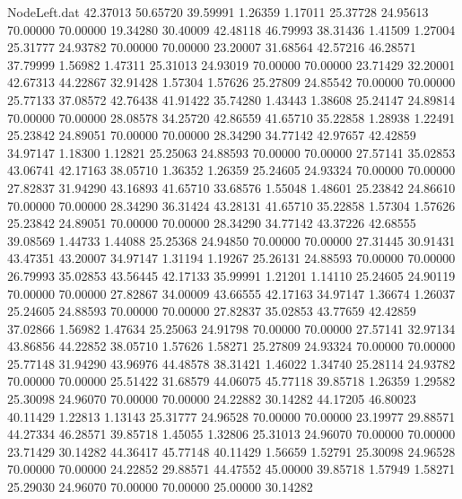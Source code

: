 \begin{filecontents}{NodeLeft.dat}
  42.37013   50.65720   39.59991     1.26359    1.17011   25.37728   24.95613   70.00000   70.00000   19.34280   30.40009
  42.48118   46.79993   38.31436     1.41509    1.27004   25.31777   24.93782   70.00000   70.00000   23.20007   31.68564
  42.57216   46.28571   37.79999     1.56982    1.47311   25.31013   24.93019   70.00000   70.00000   23.71429   32.20001
  42.67313   44.22867   32.91428     1.57304    1.57626   25.27809   24.85542   70.00000   70.00000   25.77133   37.08572
  42.76438   41.91422   35.74280     1.43443    1.38608   25.24147   24.89814   70.00000   70.00000   28.08578   34.25720
  42.86559   41.65710   35.22858     1.28938    1.22491   25.23842   24.89051   70.00000   70.00000   28.34290   34.77142
  42.97657   42.42859   34.97147     1.18300    1.12821   25.25063   24.88593   70.00000   70.00000   27.57141   35.02853
  43.06741   42.17163   38.05710     1.36352    1.26359   25.24605   24.93324   70.00000   70.00000   27.82837   31.94290
  43.16893   41.65710   33.68576     1.55048    1.48601   25.23842   24.86610   70.00000   70.00000   28.34290   36.31424
  43.28131   41.65710   35.22858     1.57304    1.57626   25.23842   24.89051   70.00000   70.00000   28.34290   34.77142
  43.37226   42.68555   39.08569     1.44733    1.44088   25.25368   24.94850   70.00000   70.00000   27.31445   30.91431
  43.47351   43.20007   34.97147     1.31194    1.19267   25.26131   24.88593   70.00000   70.00000   26.79993   35.02853
  43.56445   42.17133   35.99991     1.21201    1.14110   25.24605   24.90119   70.00000   70.00000   27.82867   34.00009
  43.66555   42.17163   34.97147     1.36674    1.26037   25.24605   24.88593   70.00000   70.00000   27.82837   35.02853
  43.77659   42.42859   37.02866     1.56982    1.47634   25.25063   24.91798   70.00000   70.00000   27.57141   32.97134
  43.86856   44.22852   38.05710     1.57626    1.58271   25.27809   24.93324   70.00000   70.00000   25.77148   31.94290
  43.96976   44.48578   38.31421     1.46022    1.34740   25.28114   24.93782   70.00000   70.00000   25.51422   31.68579
  44.06075   45.77118   39.85718     1.26359    1.29582   25.30098   24.96070   70.00000   70.00000   24.22882   30.14282
  44.17205   46.80023   40.11429     1.22813    1.13143   25.31777   24.96528   70.00000   70.00000   23.19977   29.88571
  44.27334   46.28571   39.85718     1.45055    1.32806   25.31013   24.96070   70.00000   70.00000   23.71429   30.14282
  44.36417   45.77148   40.11429     1.56659    1.52791   25.30098   24.96528   70.00000   70.00000   24.22852   29.88571
  44.47552   45.00000   39.85718     1.57949    1.58271   25.29030   24.96070   70.00000   70.00000   25.00000   30.14282

\end{filecontents}
